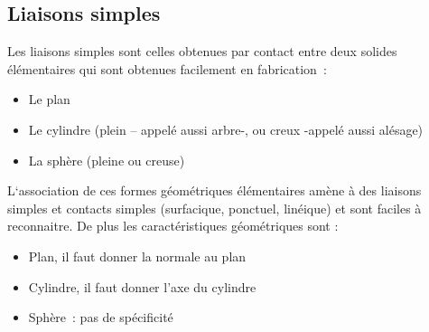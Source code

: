 \subsection{Liaisons simples}\label{liaisons-simples}

Les liaisons simples sont celles obtenues par contact entre deux solides
élémentaires qui sont obtenues facilement en fabrication~:

\begin{itemize}
\item
  Le plan
\item
  Le cylindre (plein -- appelé aussi arbre-, ou creux -appelé aussi
  alésage)
\item
  La sphère (pleine ou creuse)
\end{itemize}

L`association de ces formes géométriques élémentaires amène à des
liaisons simples et contacts simples (surfacique, ponctuel, linéique) et
sont faciles à reconnaitre. De plus les caractéristiques géométriques
sont :

\begin{itemize}
\item
  Plan, il faut donner la normale au plan
\item
  Cylindre, il faut donner l'axe du cylindre
\item
  Sphère~: pas de spécificité
\end{itemize}

